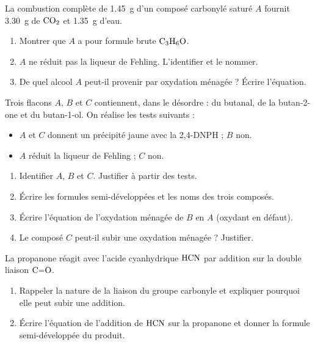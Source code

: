 \exo{} La combustion complète de \SI{1.45}{\gram} d'un composé carbonylé
saturé $A$ fournit \SI{3.30}{\gram} de $\ce{CO2}$ et \SI{1.35}{\gram} d'eau.
\begin{enumerate}[label=\arabic*)]
\item Montrer que $A$ a pour formule brute $\ce{C3H6O}$.
\item $A$ ne réduit pas la liqueur de Fehling. L'identifier et le nommer.
\item De quel alcool $A$ peut-il provenir par oxydation ménagée ? Écrire l'équation.
\end{enumerate}


Trois flacons $A$, $B$ et $C$ contiennent, dans le désordre : du butanal, de la
butan-2-one et du butan-1-ol. On réalise les tests suivants :
\begin{itemize}
\item $A$ et $C$ donnent un précipité jaune avec la 2,4-DNPH ; $B$ non.
\item $A$ réduit la liqueur de Fehling ; $C$ non.
\end{itemize}
\begin{enumerate}[label=\arabic*)]
\item Identifier $A$, $B$ et $C$. Justifier à partir des tests.
\item Écrire les formules semi-développées et les noms des trois composés.
\item Écrire l'équation de l'oxydation ménagée de $B$ en $A$ (oxydant en défaut).
\item Le composé $C$ peut-il subir une oxydation ménagée ? Justifier.
\end{enumerate}

La propanone réagit avec l'acide cyanhydrique $\ce{HCN}$ par addition sur la double
liaison $\ce{C=O}$.
\begin{enumerate}[label=\arabic*)]
\item Rappeler la nature de la liaison du groupe carbonyle et expliquer pourquoi elle
peut subir une addition.
\item Écrire l'équation de l'addition de $\ce{HCN}$ sur la propanone et donner la
formule semi-développée du produit.
\end{enumerate}
